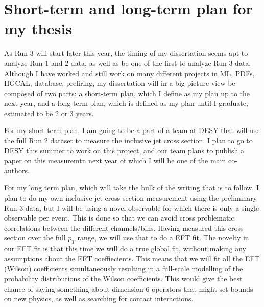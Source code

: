 \section{Short-term and long-term plan for my thesis}
As Run 3 will start later this year, the timing of my dissertation seems apt to analyze Run 1 and
2 data, as well as be one of the first to analyze Run 3 data. Although I have worked and still
work on many different projects in ML, PDFs, HGCAL, database, prefiring, my dissertation
will in a big picture view be composed of two parts: a short-term plan, which I define as my plan up to the next year, and a long-term plan, which is defined as my plan until I graduate, estimated to be 2 or 3 years. 

For my short term plan, I am going to be a part of a team at DESY that will use the full Run 2 dataset to measure the inclusive jet cross section. I plan to go to DESY this summer to work on this project, and our team plans to publish a paper on this measuremtn next year of which I will be one of the main co-authors.

For my long term plan, which will take the bulk of the writing that is to follow, I plan to do my own inclusive jet cross section measurement using the preliminary Run 3 data, but I will be using a novel observable for which there is only a single observable per event. This is done so that we can avoid cross problematic correlations between the different channels/bins. Having measured this cross section over the full $p_T$ range, we will use that to do a EFT fit. The novelty in our EFT fit is that this time we will do a true global fit, without making any assumptions about the EFT coeffiecients. This means that we will fit all the EFT (Wilson) coefficients simultaneously resulting in a full-scale modelling of the probability distributions of the Wilson coefficients. This would give the best chance of saying something about dimension-6 operators that might set bounds on new physics, as well as searching for contact interactions. 